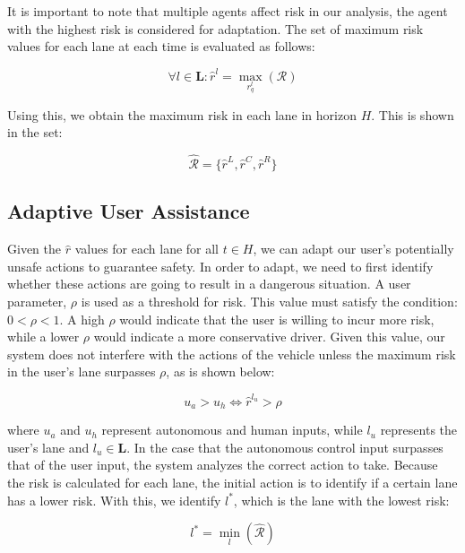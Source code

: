 \documentclass[letterpaper, 10 pt, conference]{ieeeconf}  %
\begin{document}
It is important to note that multiple agents affect risk in our analysis, the agent with the highest risk is considered for adaptation. The set of maximum risk values for each lane at each time is evaluated as follows:

\begin{equation}
    \forall{l}\in\mathbf{L}:\hat{r}^l =  \max_{r_{q}^{l}}(\mathcal{R})
\end{equation}

Using this, we obtain the maximum risk in each lane in horizon $H$. This is shown in the set:

\begin{equation}
    \hat{\mathcal{R}} = \{\hat{r}^{L},\hat{r}^{C},\hat{r}^{R}\}
\end{equation}

\subsection{Adaptive User Assistance}

Given the $\hat{r}$ values for each lane for all $t\in H$, we can adapt our user's potentially unsafe actions to guarantee safety. In order to adapt, we need to first identify whether these actions are going to result in a dangerous situation. A user parameter, $\rho$ is used as a threshold for risk. This value must satisfy the condition: $0<\rho<1$. A high $\rho$ would indicate that the user is willing to incur more risk, while a lower $\rho$ would indicate a more conservative driver. Given this value, our system does not interfere with the actions of the vehicle unless the maximum risk in the user's lane surpasses $\rho$, as is shown below:

\begin{equation}
    u_a > u_h \iff \hat r^{l_u} > \rho
\end{equation}

where $u_a$ and $u_h$ represent autonomous and human inputs, while $l_u$ represents the user's lane and $l_u \in \mathbf{L}$. In the case that the autonomous control input surpasses that of the user input, the system analyzes the correct action to take. Because the risk is calculated for each lane, the initial action is to identify if a certain lane has a lower risk. With this, we identify $l^*$, which is the lane with the lowest risk:

\begin{equation}
    l^* = \min_l(\mathcal{\hat{R}})
\end{equation}
\end{document}
